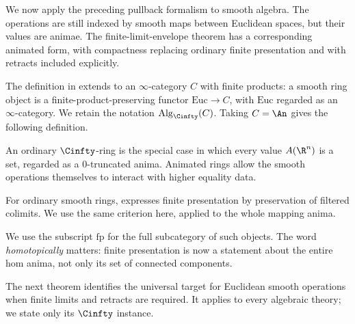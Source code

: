 We now apply the preceding pullback formalism to smooth algebra. The
operations are still indexed by smooth maps between Euclidean spaces,
but their values are animae. The finite-limit-envelope theorem has a
corresponding animated form, with compactness replacing ordinary finite
presentation and with retracts included explicitly.

The definition in  extends to an $\infty$-category $C$
with finite products: a smooth ring object is a finite-product-preserving
functor $\mathrm{Euc}\to C$, with $\mathrm{Euc}$ regarded as an
$\infty$-category. We retain the notation $\operatorname{Alg}_{\Cinfty}(C)$.
Taking $C=\An$ gives the following definition.


An ordinary $\Cinfty$-ring is the special case in which every value $A(\R^n)$
is a set, regarded as a $0$-truncated anima. Animated rings allow the smooth
operations themselves to interact with higher equality data.

For ordinary smooth rings,  expresses
finite presentation by preservation of filtered colimits. We use the same
criterion here, applied to the whole mapping anima.


We use the subscript $\mathrm{fp}$ for the full subcategory of such objects.
The word \emph{homotopically} matters: finite presentation is now a statement
about the entire hom anima, not only its set of connected components.

The next theorem identifies the universal target for Euclidean smooth
operations when finite limits and retracts are required. It applies to
every algebraic theory; we state only its $\Cinfty$ instance.

